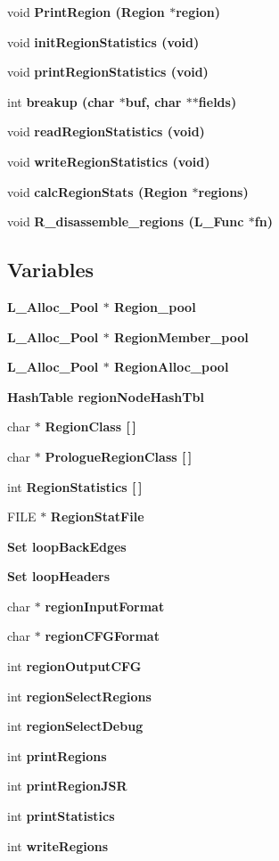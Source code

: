 \begin{CompactItemize}
void \bf{Print\-Region} (\bf{Region} $\ast$\bf{region})
\item 
void \bf{init\-Region\-Statistics} (void)
\item 
void \bf{print\-Region\-Statistics} (void)
\item 
int \bf{breakup} (char $\ast$buf, char $\ast$$\ast$fields)
\item 
void \bf{read\-Region\-Statistics} (void)
\item 
void \bf{write\-Region\-Statistics} (void)
\item 
void \bf{calc\-Region\-Stats} (\bf{Region} $\ast$regions)
\item 
void \bf{R\_\-disassemble\_\-regions} (L\_\-Func $\ast$fn)
\end{CompactItemize}
\subsection*{Variables}
\begin{CompactItemize}
\item 
\bf{L\_\-Alloc\_\-Pool} $\ast$ \bf{Region\_\-pool}
\item 
\bf{L\_\-Alloc\_\-Pool} $\ast$ \bf{Region\-Member\_\-pool}
\item 
\bf{L\_\-Alloc\_\-Pool} $\ast$ \bf{Region\-Alloc\_\-pool}
\item 
\bf{Hash\-Table} \bf{region\-Node\-Hash\-Tbl}
\item 
char $\ast$ \bf{Region\-Class} [$\,$]
\item 
char $\ast$ \bf{Prologue\-Region\-Class} [$\,$]
\item 
int \bf{Region\-Statistics} [$\,$]
\item 
FILE $\ast$ \bf{Region\-Stat\-File}
\item 
\bf{Set} \bf{loop\-Back\-Edges}
\item 
\bf{Set} \bf{loop\-Headers}
\item 
char $\ast$ \bf{region\-Input\-Format}
\item 
char $\ast$ \bf{region\-CFGFormat}
\item 
int \bf{region\-Output\-CFG}
\item 
int \bf{region\-Select\-Regions}
\item 
int \bf{region\-Select\-Debug}
\item 
int \bf{print\-Regions}
\item 
int \bf{print\-Region\-JSR}
\item 
int \bf{print\-Statistics}
\item 
int \bf{write\-Regions}
\end{CompactItemize}


